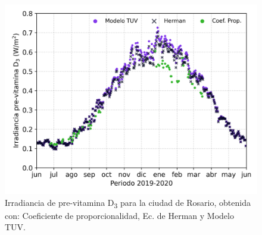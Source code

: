 \documentclass[10pt,twocolumn]{article}
\begin{document}
\begin{figure}[ht]
  \centering
  \includegraphics[scale=0.47]{Max_previtamin_D.png}
  \caption{Irradiancia de pre-vitamina D\textsubscript{3} para la ciudad de Rosario, obtenida con: Coeficiente de proporcionalidad, Ec. de Herman y Modelo TUV.}
  \label{fig:previtamin}
\end{figure}
\end{document}
